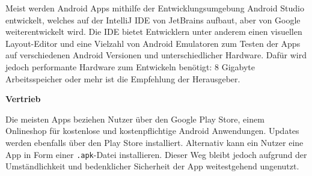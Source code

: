 

Meist werden Android Apps mithilfe der Entwicklungsumgebung Android Studio entwickelt, welches auf der IntelliJ IDE von JetBrains aufbaut, aber von Google weiterentwickelt wird. Die IDE bietet Entwicklern unter anderem einen visuellen Layout-Editor und eine Vielzahl von Android Emulatoren zum Testen der Apps auf verschiedenen Android Versionen und unterschiedlicher Hardware. Dafür wird jedoch performante Hardware zum Entwickeln benötigt: 8 Gigabyte Arbeitsspeicher oder mehr ist die Empfehlung der Herausgeber. \cite{AndroidStudio}

\textbf{Vertrieb}

Die meisten Apps beziehen Nutzer über den Google Play Store, einem Onlineshop für kostenlose und kostenpflichtige Android Anwendungen. 
Updates werden ebenfalls über den Play Store installiert. Alternativ kann ein Nutzer eine App in Form einer \texttt{.apk}-Datei installieren. Dieser Weg bleibt jedoch aufgrund der Umständlichkeit und bedenklicher Sicherheit der App weitestgehend ungenutzt.

